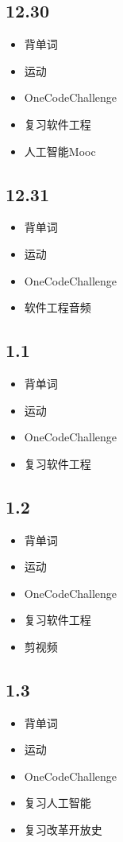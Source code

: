 \documentclass[UTF8]{ctexart}
\begin{document}
\subsection*{12.30}
\begin{itemize}
    \item 背单词
    \item 运动
    \item OneCodeChallenge
    \item 复习软件工程
    \item 人工智能Mooc
\end{itemize}

\subsection*{12.31}
\begin{itemize}
    \item 背单词
    \item 运动
    \item OneCodeChallenge
    \item 软件工程音频
\end{itemize}

\subsection*{1.1}
\begin{itemize}
    \item 背单词
    \item 运动
    \item OneCodeChallenge
    \item 复习软件工程
\end{itemize}

\subsection*{1.2}
\begin{itemize}
    \item 背单词
    \item 运动
    \item OneCodeChallenge
    \item 复习软件工程
    \item 剪视频
\end{itemize}

\subsection*{1.3}
\begin{itemize}
    \item 背单词
    \item 运动
    \item OneCodeChallenge
    \item 复习人工智能
    \item 复习改革开放史
\end{itemize}
\end{document}
